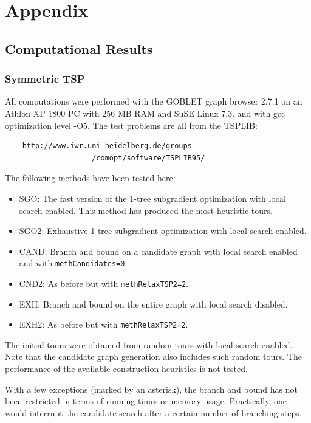 \documentclass[a4paper,11pt,twoside]{book}
\begin{document}
\part{Appendix}
\begin{multicols}{2}

\chapter{Computational Results}
\thispagestyle{fancy}
\label{clb_results}

\section{Symmetric TSP}
All computations were performed with the GOBLET graph browser 2.7.1 on an
Athlon XP 1800 PC with 256 MB RAM and SuSE Linux 7.3. and with gcc optimization
level -O5. The test problems are all from the TSPLIB:
\begin{verbatim}
    http://www.iwr.uni-heidelberg.de/groups
                    /comopt/software/TSPLIB95/
\end{verbatim}
The following methods have been tested here:
\begin{itemize}
\item SGO: The fast version of the 1-tree subgradient optimization
    with local search enabled. This method has produced the most heuristic tours.
\item SGO2: Exhaustive 1-tree subgradient optimization with local
    search enabled.
\item CAND: Branch and bound on a candidate graph with
    local search enabled and with \verb/methCandidates=0/.
\item CND2: As before but with \verb/methRelaxTSP2=2/.
\item EXH: Branch and bound on the entire graph with local search
    disabled.
\item EXH2: As before but with \verb/methRelaxTSP2=2/.
\end{itemize}
The initial tours were obtained from random tours with local search enabled.
Note that the candidate graph generation also includes such random tours. The
performance of the available construction heuristics is not tested.

With a few exceptions (marked by an asterisk), the branch and bound has not
been restricted in terms of running times or memory usage. Practically, one
would interrupt the candidate search after a certain number of branching steps.



\end{multicols}
\end{document}

